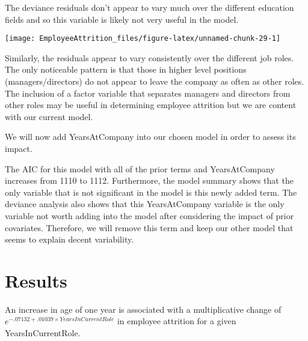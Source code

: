 \documentclass[]{article}
\begin{document}
The deviance residuals don't appear to vary much over the different
education fields and so this variable is likely not very useful in the
model.

\begin{center}\texttt{[image: EmployeeAttrition\_files/figure-latex/unnamed-chunk-29-1]} \end{center}

Similarly, the residuals appear to vary consistently over the different
job roles. The only noticeable pattern is that those in higher level
positions (managers/directors) do not appear to leave the company as
often as other roles. The inclusion of a factor variable that separates
managers and directors from other roles may be useful in determining
employee attrition but we are content with our current model.

We will now add YearsAtCompany into our chosen model in order to assess
its impact.

The AIC for this model with all of the prior terms and YearsAtCompany
increases from 1110 to 1112. Furthermore, the model summary shows that
the only variable that is not significant in the model is this newly
added term. The deviance analysis also shows that this YearsAtCompany
variable is the only variable not worth adding into the model after
considering the impact of prior covariates. Therefore, we will remove
this term and keep our other model that seems to explain decent
variability.

\hypertarget{results}{%
\section{Results}\label{results}}

An increase in age of one year is associated with a multiplicative
change of \(e^{-.07132 + .01039 \times YearsInCurrentRole}\) in employee
attrition for a given YearsInCurrentRole.
\end{document}
